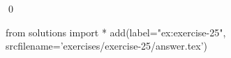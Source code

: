 
\begin{ex} 
  \label{ex:exercise-25}
  
  \qed
\end{ex} 
\begin{python0}
from solutions import *
add(label="ex:exercise-25",
    srcfilename='exercises/exercise-25/answer.tex') 
\end{python0}
